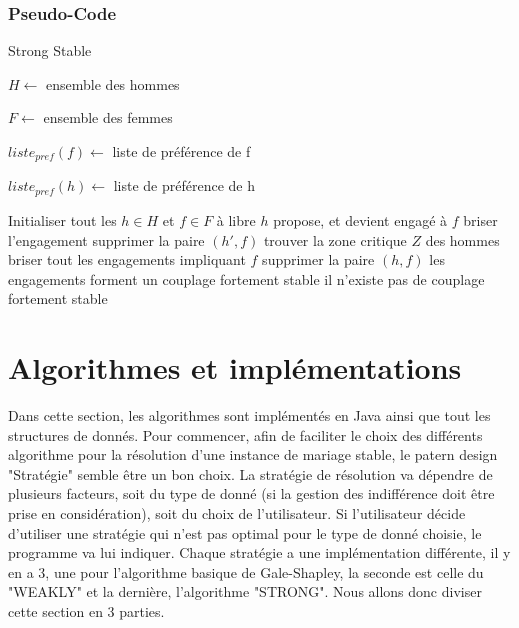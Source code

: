 \documentclass[11pt]{article}
\begin{document}
\subsubsection{Pseudo-Code}
\begin{algorithm}
\caption{Strong Stable}
\begin{algorithmic} 
\REQUIRE 
\begin{list}{}{'}
	\item $H \leftarrow$ ensemble des hommes
	\item $F \leftarrow$ ensemble des femmes
    \item $liste_{pref}(f) \leftarrow$ liste de préférence de f
    \item $liste_{pref}(h) \leftarrow$ liste de préférence de h
\end{list} 
\STATE Initialiser tout les $h \in H$ et $f \in F$ à libre
\REPEAT 
			\STATE $h$ propose, et devient engagé à $f$
					\STATE briser l'engagement
				\ENDIF
				\STATE supprimer la paire $(h',f)$
			\ENDFOR
		\ENDFOR
	\ENDWHILE
		\STATE trouver la zone critique $Z$ des hommes
			\STATE briser tout les engagements impliquant $f$
				\STATE supprimer la paire $(h, f)$				
			\ENDFOR
		\ENDFOR
	\ENDIF
{}
	\STATE les engagements forment un couplage fortement stable 
\ELSE
\STATE il n'existe pas de couplage fortement stable 
\ENDIF

\end{algorithmic}
\end{algorithm}

\section{Algorithmes et implémentations}\label{algo}
Dans cette section, les algorithmes sont implémentés en Java ainsi que tout
les structures de donnés. Pour commencer, afin de faciliter le choix des
différents algorithme pour la résolution d'une instance de mariage stable,
le patern design "Stratégie" semble être un bon choix. La stratégie de
résolution va dépendre de plusieurs facteurs, soit du type de donné (si
la gestion des indifférence doit être prise en considération), soit du
choix de l'utilisateur. Si l'utilisateur décide d'utiliser une stratégie
qui n'est pas optimal pour le type de donné choisie, le programme va lui
indiquer. Chaque stratégie a une implémentation différente, il y en a 3, une pour
l'algorithme basique de Gale-Shapley, la seconde est celle du "WEAKLY" et la dernière, l'algorithme "STRONG". Nous allons donc diviser cette section en 3 parties.
\end{document}
